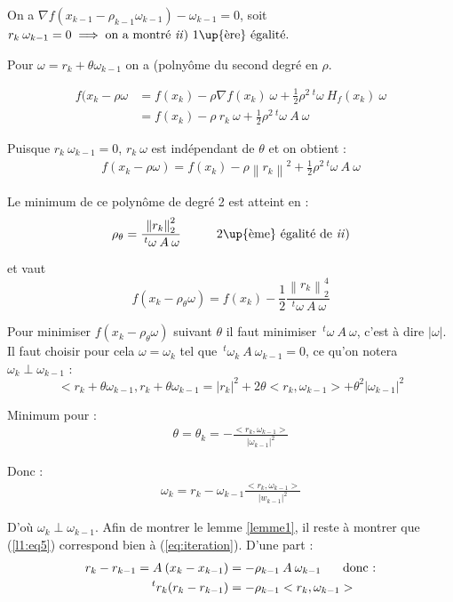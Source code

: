 \documentclass[a4paper,11pt]{article}
\newcommand{\norm}[1]{\left\lVert#1\right\rVert}
\newcommand{\tpo}[1]{\,^t#1}
\theoremstyle{plain} %
\begin{document}
On a $\nabla f(x_{k-1} - \rho_{k-1} \omega_{k-1}) - \omega_{k-1} = 0$, soit
$r_k \: \omega_{k-1} = 0 \implies \text{on a montré \textit{ii}) 1\up{ère} égalité.}$

Pour $\omega = r_k + \theta \omega_{k-1}$ on a (polnyôme du second degré en $\rho$.

\begin{align*}
    f(x_k - \rho \omega & = f(x_k) - \rho \nabla f(x_k) \: \omega + \frac{1}{2} \rho^2 \tpo \omega \: H_f(x_k) \: \omega \\
    & = f(x_k) - \rho \: r_k \: \omega + \frac{1}{2} \rho^2 \tpo \omega \: A \: \omega
\end{align*}

Puisque $r_k \: \omega_{k-1} = 0$, $r_k \: \omega$ est indépendant de $\theta$ et on obtient :
\begin{align}
    f(x_k - \rho \omega) = f(x_k) - \rho \norm{r_k}^2 + \frac{1}{2} \rho^2 \tpo \omega \: A \: \omega
    \label{eq:4}
\end{align}

Le minimum de ce polynôme de degré 2 est atteint en :
\[
    \rho_{\theta} = \frac{\norm{r_k}^2_2}{\tpo \omega \: A \: \omega} \hspace{1cm}
    \text{2\up{ème} égalité de \textit{ii})}
\]

et vaut 
\[
    f(x_k - \rho_\theta \omega) = f(x_k) - \frac{1}{2} \frac{\norm{r_k}_2^4}{\tpo \omega \: A \: \omega}
\]

Pour minimiser $f(x_k - \rho_\theta \omega)$ suivant $\theta$ il faut minimiser 
$\tpo \omega \: A \: \omega$, c'est à dire $|\omega|$.
Il faut choisir pour cela $\omega = \omega_k$ tel que $\tpo \omega_k \: A \: \omega_{k-1} = 0$, ce qu'on notera $\omega_k \perp \omega_{k-1}$ :
\[
    < r_k + \theta \omega_{k-1}, r_k + \theta \omega_{k-1} = |r_k|^2 + 2 \theta <r_k, \omega_{k-1} >
    + \theta^2 |\omega_{k-1}|^2
\]

Minimum pour :
\begin{align}
    \theta = \theta_k = - \frac{<r_k, \omega_{k-1}>}{|\omega_{k-1}|^2}
    \label{l1:eq5}
\end{align}

Donc :
\begin{align}
    \omega_k = r_k - \omega_{k-1} \frac{<r_k,\omega_{k-1}>}{|w_{k-1}|^2}
    \label{l1:eq6}
\end{align}

D'où $\omega_k \perp \omega_{k-1}$. Afin de montrer le lemme \ref{lemme1}, il reste à
montrer que (\ref{l1:eq5}) correspond bien à (\ref{eq:iteration}).
D'une part :
\begin{align}
    r_k - r_{k-1} = A \: (x_k - x_{k-1}) & = - \rho_{k-1} \: A \: \omega_{k-1} \hspace{0.5cm}\text{ donc :} \notag \\
    \tpo r_k (r_k - r_{k-1}) & = - \rho_{k-1} <r_k,\omega_{k-1}>
    \label{l1:eq7}
\end{align}
\end{document}
